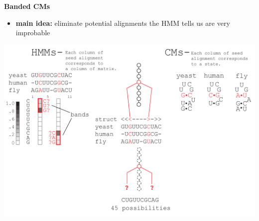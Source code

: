 \documentclass[landscape]{slides}
\begin{document}
\begin{slide}
\begin{center}
\large
\textbf{Banded CMs}
\end{center}
\medskip
\small
\begin{itemize}
\item
\textbf{main idea:} eliminate potential alignments the HMM tells us are very improbable
\end{itemize}
\begin{center}
\includegraphics[width=8in]{figs/post_hmm_to_cm_map2_layer15}
\end{center}
\vfill
\end{slide}
\end{document}
